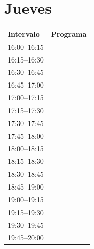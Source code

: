 \documentclass[11pt,a4paper]{article}
\begin{document}
\clearpage
\section*{Jueves}
\begin{center}
\begin{adjustbox}{max totalsize={\textwidth}{0.82\textheight},center}
\begin{tabular}{|p{3.6cm}|p{11cm}|}
\hline
\textbf{Intervalo} & \textbf{Programa} \\
\cline{1-1}
{\centering\rule{0pt}{2.80ex}16:00--16:15} & {\centering\rule{0pt}{2.80ex}} \\
\cline{1-1}
{\centering\rule{0pt}{2.80ex}16:15--16:30} & {\centering\rule{0pt}{2.80ex}} \\
\cline{1-1}
{\centering\rule{0pt}{2.80ex}16:30--16:45} & {\centering\rule{0pt}{2.80ex}} \\
\cline{1-1}
{\centering\rule{0pt}{2.80ex}16:45--17:00} & {\centering\rule{0pt}{2.80ex}} \\
\cline{1-1}
{\centering\rule{0pt}{2.80ex}17:00--17:15} & {\centering\rule{0pt}{2.80ex}} \\
\cline{1-1}
{\centering\rule{0pt}{2.80ex}17:15--17:30} & {\centering\rule{0pt}{2.80ex}} \\
\cline{1-1}
{\centering\rule{0pt}{2.80ex}17:30--17:45} & {\centering\rule{0pt}{2.80ex}} \\
\cline{1-1}
{\centering\rule{0pt}{2.80ex}17:45--18:00} & {\centering\rule{0pt}{2.80ex}} \\
\cline{1-1}
{\centering\rule{0pt}{2.80ex}18:00--18:15} & {\centering\rule{0pt}{2.80ex}} \\
\cline{1-1}
{\centering\rule{0pt}{2.80ex}18:15--18:30} & {\centering\rule{0pt}{2.80ex}} \\
\cline{1-1}
{\centering\rule{0pt}{2.80ex}18:30--18:45} & {\centering\rule{0pt}{2.80ex}} \\
\cline{1-1}
{\centering\rule{0pt}{2.80ex}18:45--19:00} & {\centering\rule{0pt}{2.80ex}} \\
\cline{1-1}
{\centering\rule{0pt}{2.80ex}19:00--19:15} & {\centering\rule{0pt}{2.80ex}} \\
\cline{1-1}
{\centering\rule{0pt}{2.80ex}19:15--19:30} & {\centering\rule{0pt}{2.80ex}} \\
\cline{1-1}
{\centering\rule{0pt}{2.80ex}19:30--19:45} & {\centering\rule{0pt}{2.80ex}} \\
\cline{1-1}
{\centering\rule{0pt}{2.80ex}19:45--20:00} & {\centering\rule{0pt}{2.80ex}} \\

\end{tabular}
\end{adjustbox}
\end{center}
\end{document}
